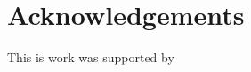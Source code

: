 \documentclass[smallextended]{svjour3}       %
\begin{document}
\section{Acknowledgements}
This is work was supported by 






\end{document}

